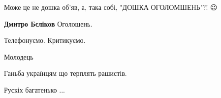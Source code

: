 \begin{itemize}
 
Може це не дошка об'яв, а, така собі, "ДОШКА ОГОЛОМШЕНЬ"?! 😉

\begin{itemize}
 
\textbf{Дмитро Бєліков} Оголошень.
\end{itemize}

 
Телефонуємо. Критикуємо.

 
Молодець

 
Ганьба українцям що терплять рашистів.

 
Рускіх багатенько ...

 


\end{itemize}
